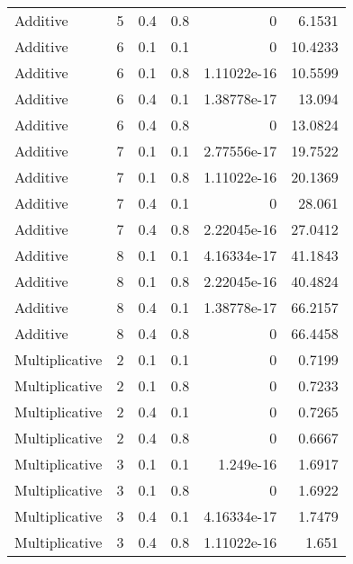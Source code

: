 \documentclass{article}
\begin{document}
\begin{figure}[H]
\begin{tabular}{lrrrrr}
 Additive       &       5 &   0.4 &            0.8 & 0           &            6.1531 \\
 Additive       &       6 &   0.1 &            0.1 & 0           &           10.4233 \\
 Additive       &       6 &   0.1 &            0.8 & 1.11022e-16 &           10.5599 \\
 Additive       &       6 &   0.4 &            0.1 & 1.38778e-17 &           13.094  \\
 Additive       &       6 &   0.4 &            0.8 & 0           &           13.0824 \\
 Additive       &       7 &   0.1 &            0.1 & 2.77556e-17 &           19.7522 \\
 Additive       &       7 &   0.1 &            0.8 & 1.11022e-16 &           20.1369 \\
 Additive       &       7 &   0.4 &            0.1 & 0           &           28.061  \\
 Additive       &       7 &   0.4 &            0.8 & 2.22045e-16 &           27.0412 \\
 Additive       &       8 &   0.1 &            0.1 & 4.16334e-17 &           41.1843 \\
 Additive       &       8 &   0.1 &            0.8 & 2.22045e-16 &           40.4824 \\
 Additive       &       8 &   0.4 &            0.1 & 1.38778e-17 &           66.2157 \\
 Additive       &       8 &   0.4 &            0.8 & 0           &           66.4458 \\
 Multiplicative &       2 &   0.1 &            0.1 & 0           &            0.7199 \\
 Multiplicative &       2 &   0.1 &            0.8 & 0           &            0.7233 \\
 Multiplicative &       2 &   0.4 &            0.1 & 0           &            0.7265 \\
 Multiplicative &       2 &   0.4 &            0.8 & 0           &            0.6667 \\
 Multiplicative &       3 &   0.1 &            0.1 & 1.249e-16   &            1.6917 \\
 Multiplicative &       3 &   0.1 &            0.8 & 0           &            1.6922 \\
 Multiplicative &       3 &   0.4 &            0.1 & 4.16334e-17 &            1.7479 \\
 Multiplicative &       3 &   0.4 &            0.8 & 1.11022e-16 &            1.651  \\

\end{tabular}
\end{figure}
\end{document}
